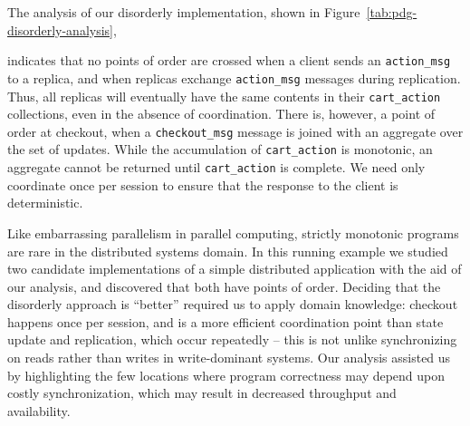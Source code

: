 The analysis of our disorderly implementation, shown in
Figure~\ref{tab:pdg-disorderly-analysis},
%

%
indicates that no points of order are crossed when a client sends an
\texttt{action\_msg} to a replica, and when replicas exchange
\texttt{action\_msg} messages during replication.  Thus, all replicas will
eventually have the same contents in their \texttt{cart\_action} collections,
even in the absence of coordination.  There is, however, a point of order at
checkout, when a \texttt{checkout\_msg} message is joined with an aggregate
over the set of updates.  While the accumulation of \texttt{cart\_action} is
monotonic, an aggregate cannot be returned until \texttt{cart\_action} is
complete.
We need only coordinate once per session to ensure that the response to the
client is deterministic.

Like embarrassing parallelism in parallel computing, strictly monotonic
programs are rare in the distributed systems domain.  In this running example
we studied two candidate implementations of a simple distributed application
with the aid of our analysis, and discovered that both have points of order.
Deciding that the disorderly approach is ``better'' required us to apply domain
knowledge: checkout happens once per session, and is a more efficient
coordination point than state update and replication, which occur repeatedly --
this is not unlike synchronizing on reads rather than writes in write-dominant
systems.  Our analysis assisted us by highlighting the few locations where
program correctness may depend upon costly synchronization, which may result in
decreased throughput and availability.  

